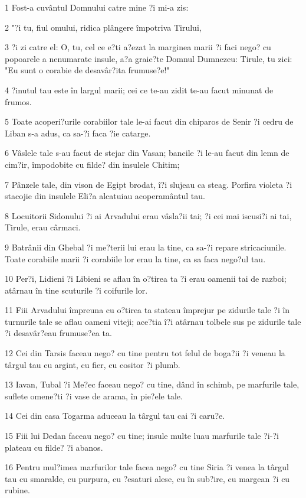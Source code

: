 \par 1 Fost-a cuvântul Domnului catre mine ?i mi-a zis:
\par 2 "?i tu, fiul omului, ridica plângere împotriva Tirului,
\par 3 ?i zi catre el: O, tu, cel ce e?ti a?ezat la marginea marii ?i faci nego? cu popoarele a nenumarate insule, a?a graie?te Domnul Dumnezeu: Tirule, tu zici: "Eu sunt o corabie de desavâr?ita frumuse?e!"
\par 4 ?inutul tau este în largul marii; cei ce te-au zidit te-au facut minunat de frumos.
\par 5 Toate acoperi?urile corabiilor tale le-ai facut din chiparos de Senir ?i cedru de Liban s-a adus, ca sa-?i faca ?ie catarge.
\par 6 Vâslele tale s-au facut de stejar din Vasan; bancile ?i le-au facut din lemn de cim?ir, împodobite cu filde? din insulele Chitim;
\par 7 Pânzele tale, din vison de Egipt brodat, î?i slujeau ca steag. Porfira violeta ?i stacojie din insulele Eli?a alcatuiau acoperamântul tau.
\par 8 Locuitorii Sidonului ?i ai Arvadului erau vâsla?ii tai; ?i cei mai iscusi?i ai tai, Tirule, erau cârmaci.
\par 9 Batrânii din Ghebal ?i me?terii lui erau la tine, ca sa-?i repare stricaciunile. Toate corabiile marii ?i corabiile lor erau la tine, ca sa faca nego?ul tau.
\par 10 Per?i, Lidieni ?i Libieni se aflau în o?tirea ta ?i erau oamenii tai de razboi; atârnau în tine scuturile ?i coifurile lor.
\par 11 Fiii Arvadului împreuna cu o?tirea ta stateau împrejur pe zidurile tale ?i în turnurile tale se aflau oameni viteji; ace?tia î?i atârnau tolbele sus pe zidurile tale ?i desavâr?eau frumuse?ea ta.
\par 12 Cei din Tarsis faceau nego? cu tine pentru tot felul de boga?ii ?i veneau la târgul tau cu argint, cu fier, cu cositor ?i plumb.
\par 13 Iavan, Tubal ?i Me?ec faceau nego? cu tine, dând în schimb, pe marfurile tale, suflete omene?ti ?i vase de arama, în pie?ele tale.
\par 14 Cei din casa Togarma aduceau la târgul tau cai ?i caru?e.
\par 15 Fiii lui Dedan faceau nego? cu tine; insule multe luau marfurile tale ?i-?i plateau cu filde? ?i abanos.
\par 16 Pentru mul?imea marfurilor tale facea nego? cu tine Siria ?i venea la târgul tau cu smaralde, cu purpura, cu ?esaturi alese, cu în sub?ire, cu margean ?i cu rubine.
